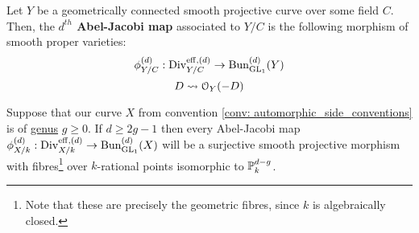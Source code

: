             \begin{definition} \label{def: the_abel_jacobi_map}
                Let $Y$ be a geometrically connected smooth projective curve over some field $C$. Then, the \textbf{$d^{th}$ Abel-Jacobi map} associated to $Y/C$ is the following morphism of smooth proper varieties:
                    $$\AJ_{Y/C}^{(d)}: \Div_{Y/C}^{\eff, (d)} \to \Bun_{\GL_1}^{(d)}(Y)$$
                    $$D \mapsto \calO_Y(-D)$$
            \end{definition}
            \begin{proposition} \label{prop: the_unramified_abel_jacobi_map_is_a_projective_bundle}
                Suppose that our curve $X$ from convention \ref{conv: automorphic_side_conventions} is of \href{https://stacks.math.columbia.edu/tag/0BY6}{\underline{genus}} $g \geq 0$. If $d \geq 2g - 1$ then every Abel-Jacobi map $\AJ_{X/k}^{(d)}: \Div_{X/k}^{\eff, (d)} \to \Bun_{\GL_1}^{(d)}(X)$ will be a surjective smooth projective morphism with fibres\footnote{Note that these are precisely the geometric fibres, since $k$ is algebraically closed.} over $k$-rational points isomorphic to $\P^{d - g}_k$.
            \end{proposition}
